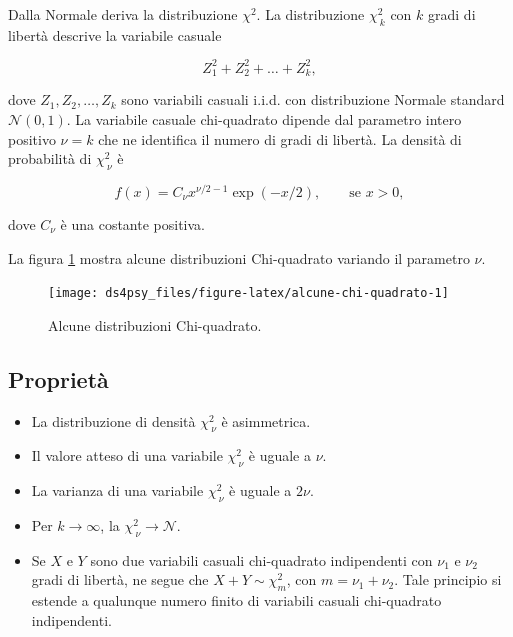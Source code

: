 \documentclass[
  11pt,
]{krantz}
\theoremstyle{definition}
\theoremstyle{definition}
\theoremstyle{definition}
\theoremstyle{definition}
\theoremstyle{remark}
\begin{document}
Dalla Normale deriva la distribuzione \(\chi^2\). La distribuzione \(\chi^2_{~k}\) con \(k\) gradi di libertà descrive la variabile casuale

\[
Z_1^2 + Z_2^2 + \dots + Z_k^2,
\]

dove \(Z_1, Z_2, \dots, Z_k\) sono variabili casuali i.i.d. con distribuzione Normale standard \(\mathcal{N}(0, 1)\). La variabile casuale chi-quadrato dipende dal parametro intero positivo \(\nu = k\) che ne identifica il numero di gradi di libertà. La densità di probabilità di \(\chi^2_{~\nu}\) è

\[
f(x) = C_{\nu} x^{\nu/2-1} \exp (-x/2), \qquad \text{se } x > 0,
\]

dove \(C_{\nu}\) è una costante positiva.

La figura \ref{fig:alcune-chi-quadrato} mostra alcune distribuzioni Chi-quadrato variando il parametro \(\nu\).

\begin{figure}[h]

{\centering \texttt{[image: ds4psy\_files/figure-latex/alcune-chi-quadrato-1]} 

}

\caption{Alcune distribuzioni Chi-quadrato.}\label{fig:alcune-chi-quadrato}
\end{figure}

\hypertarget{proprietuxe0-1}{%
\subsection{Proprietà}\label{proprietuxe0-1}}

\begin{itemize}
\item
  La distribuzione di densità \(\chi^2_{~\nu}\) è asimmetrica.
\item
  Il valore atteso di una variabile \(\chi^2_{~\nu}\) è uguale a \(\nu\).
\item
  La varianza di una variabile \(\chi^2_{~\nu}\) è uguale a \(2\nu\).
\item
  Per \(k \rightarrow \infty\), la \(\chi^2_{~\nu} \rightarrow \mathcal{N}\).
\item
  Se \(X\) e \(Y\) sono due variabili casuali chi-quadrato indipendenti con \(\nu_1\) e \(\nu_2\) gradi di libertà, ne segue che \(X + Y \sim \chi^2_m\), con \(m = \nu_1 + \nu_2\). Tale principio si estende a qualunque numero finito di variabili casuali chi-quadrato indipendenti.
\end{itemize}
\end{document}
